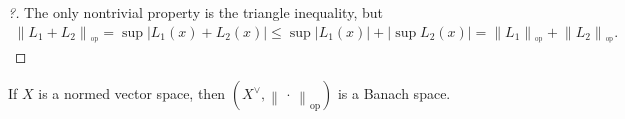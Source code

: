 \begin{proof}[?]

The only nontrivial property is the triangle inequality, but
\begin{align*}
{\left\lVert {L_{1} + L_{2}} \right\rVert}_{^{\operatorname{op}}} = \sup {\left\lvert {L_{1}(x) + L_{2}(x)} \right\rvert} \leq \sup {\left\lvert {L_{1}(x)} \right\rvert} + {\left\lvert {\sup L_{2}(x)} \right\rvert} = {\left\lVert {L_{1}} \right\rVert}_{^{\operatorname{op}}}+ {\left\lVert {L_{2}} \right\rVert}_{^{\operatorname{op}}}
.\end{align*}

\end{proof}

\begin{theorem}

If \(X\) is a normed vector space, then
\((X^\vee, {\left\lVert {{\,\cdot\,}} \right\rVert}_{\text{op}})\) is a
Banach space.

\end{theorem}

